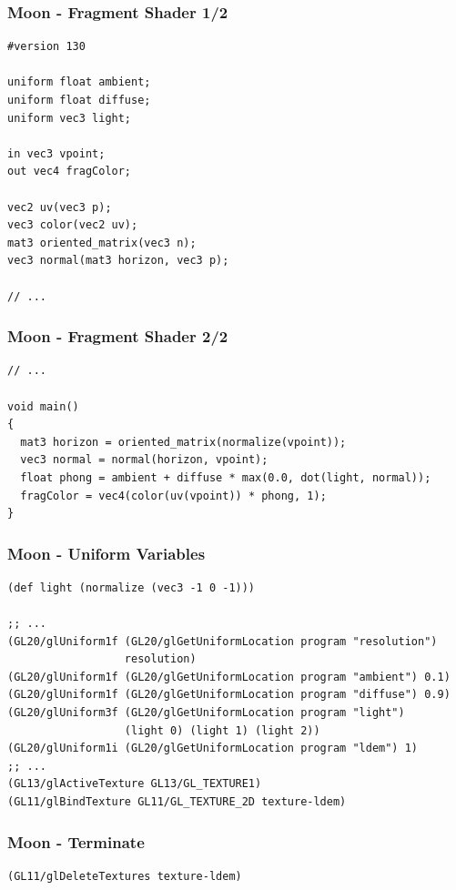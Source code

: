 \documentclass[aspectratio=169,11pt,xcolor=dvipsnames]{beamer}
\begin{document}
\begin{frame}[fragile]
  \frametitle{Moon {-} Fragment Shader 1/2}
  \begin{verbatim}
#version 130

uniform float ambient;
uniform float diffuse;
uniform vec3 light;

in vec3 vpoint;
out vec4 fragColor;

vec2 uv(vec3 p);
vec3 color(vec2 uv);
mat3 oriented_matrix(vec3 n);
vec3 normal(mat3 horizon, vec3 p);

// ...
  \end{verbatim}
\end{frame}

\begin{frame}[fragile]
  \frametitle{Moon {-} Fragment Shader 2/2}
  \begin{verbatim}
// ...

void main()
{
  mat3 horizon = oriented_matrix(normalize(vpoint));
  vec3 normal = normal(horizon, vpoint);
  float phong = ambient + diffuse * max(0.0, dot(light, normal));
  fragColor = vec4(color(uv(vpoint)) * phong, 1);
}
  \end{verbatim}
\end{frame}

\begin{frame}[fragile]
  \frametitle{Moon {-} Uniform Variables}
  \begin{verbatim}
(def light (normalize (vec3 -1 0 -1)))

;; ...
(GL20/glUniform1f (GL20/glGetUniformLocation program "resolution")
                  resolution)
(GL20/glUniform1f (GL20/glGetUniformLocation program "ambient") 0.1)
(GL20/glUniform1f (GL20/glGetUniformLocation program "diffuse") 0.9)
(GL20/glUniform3f (GL20/glGetUniformLocation program "light")
                  (light 0) (light 1) (light 2))
(GL20/glUniform1i (GL20/glGetUniformLocation program "ldem") 1)
;; ...
(GL13/glActiveTexture GL13/GL_TEXTURE1)
(GL11/glBindTexture GL11/GL_TEXTURE_2D texture-ldem)
  \end{verbatim}
\end{frame}

\begin{frame}[fragile]
  \frametitle{Moon {-} Terminate}
  \begin{verbatim}
(GL11/glDeleteTextures texture-ldem)
  \end{verbatim}
\end{frame}
\end{document}
